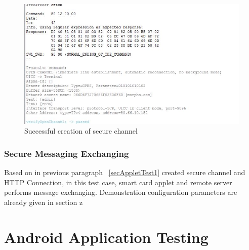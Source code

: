 \begin{figure}[!htp]
	\centering
	\includegraphics[width=1.1\textwidth]{Images/impl/verify-pass.jpg}
		\caption{Successful creation of secure channel}
	\label{fig:verify-pass}
\end{figure}

\subsubsection{Secure Messaging Exchanging}
Based on in previous paragraph ~\ref{secAppletTest1} created secure channel and HTTP Connection, in this test case, smart card applet and remote server performs message exchanging. Demonstration configuration parameters are already given in section z

\section{Android Application Testing}